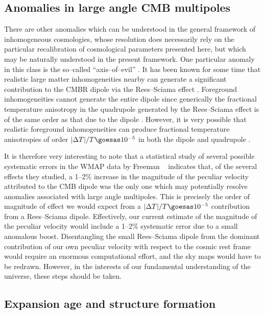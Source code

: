 \documentclass[12pt]{iopart}
\begin{document}
\subsection{Anomalies in large angle CMB multipoles\label{pole}}

There are other anomalies which can be understood in the general framework
of inhomogeneous cosmologies, whose resolution does necessarily rely on
the particular recalibration of cosmological parameters presented here,
but which may be naturally understood in the present framework. One
particular anomaly in this class is the so--called ``axis--of--evil''
\cite{axis}.
It has been known for some time that realistic large matter inhomogeneities
nearby can generate a significant contribution to the CMBR dipole via the
Rees--Sciama effect \cite{RS}. Foreground inhomogeneities cannot generate
the entire dipole since generically the fractional temperature anisotropy in
the quadrupole generated by the Rees--Sciama effect is of the same order
as that due to the dipole \cite{MM}. However, it is
very possible that realistic foreground inhomogeneities can produce
fractional temperature anisotropies of order $|\Delta T|/T\goesas10^{-5}$
in both the dipole and quadrupole \cite{RRS}.

It is therefore very interesting to note that a statistical
study of several possible systematic errors in the WMAP data by Freeman
\etal\ \cite{Freeman} indicates that, of the several effects they studied,
a 1--2\% increase in the magnitude of the peculiar velocity attributed
to the CMB dipole was the only one which may potentially resolve anomalies
associated with large angle multipoles. This is precisely the order of
magnitude of effect we would expect from a $|\Delta T|/T\goesas10^{-5}$
contribution from a Rees--Sciama dipole. Effectively, our current estimate
of the magnitude of the peculiar velocity would include a 1--2\% systematic
error due to a small anomalous boost. Disentangling the small Rees--Sciama
dipole from the dominant contribution of our own peculiar velocity with
respect to the cosmic rest frame would require an enormous computational
effort, and the sky maps would have to be redrawn. However, in the interests
of our fundamental understanding of the universe, these steps should be taken.

\subsection{Expansion age and structure formation\label{age}}
\end{document}
